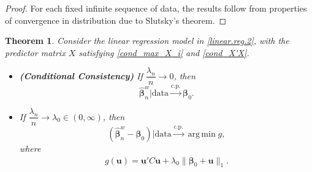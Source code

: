 \documentclass[12pt]{article}
\DeclareMathOperator*{\argmin}{arg\,min} %
\newcommand{\bnw}{\widehat{\bm{\beta}}_n^w} %
\newcommand{\be}{\bm{\beta}} %
\newcommand{\CONV}[1]{\stackrel{\text{#1}}{\longrightarrow}} %
\newcommand{\bu}{\bm{u}} %
\newtheorem{thm}{Theorem}[section]
\begin{document}
\begin{proof}
	For each fixed infinite sequence of data, the results follow from properties of convergence in distribution due to Slutsky's theorem.
\end{proof}

\begin{thm} \label{consistency}
	Consider the linear regression model in \eqref{linear.reg.2}, with the predictor matrix $X$ satisfying \eqref{cond_max_X_i} and \eqref{cond_X'X}. 
	\begin{itemize}
		\item [ (a) ] \textbf{(Conditional Consistency)} If $\dfrac{\lambda_n}{n} \to 0$, then
			  $$
			  \bnw \big| \text{data} \CONV{c.p.} \be_0.
			  $$
		\item [ (b) ] 	If $\dfrac{\lambda_n}{n} \to \lambda_0 \in (0,\infty)$, then 
			  $$
			  \left( \bnw - \be_0 \right) \bigg| \text{data} \CONV{c.p.} \argmin g,
			  $$
			  where
			  \begin{align*} 
					g(\bu) = \bu' C \bu 
					+ \lambda_0 \| \be_0 + \bu \|_1 .
			  \end{align*}  
	\end{itemize} 
\end{thm}
\end{document}
